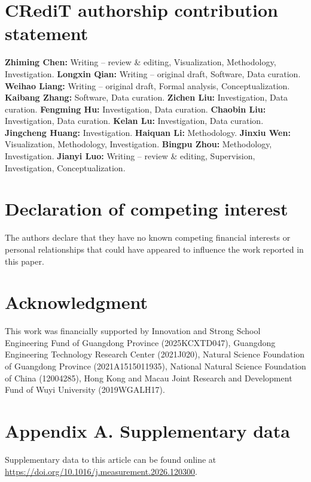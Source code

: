 \documentclass[11pt]{article}
\begin{document}
\section*{CRediT authorship contribution statement}

\textbf{Zhiming Chen:} Writing -- review \& editing,
Visualization, Methodology, Investigation.
\textbf{Longxin Qian:} Writing -- original draft, Software, Data
curation.
\textbf{Weihao Liang:} Writing -- original draft, Formal analysis,
Conceptualization.
\textbf{Kaibang Zhang:} Software, Data curation.
\textbf{Zichen Liu:} Investigation, Data curation.
\textbf{Fengming Hu:} Investigation, Data curation.
\textbf{Chaobin Liu:} Investigation, Data curation.
\textbf{Kelan Lu:} Investigation, Data curation.
\textbf{Jingcheng Huang:} Investigation.
\textbf{Haiquan Li:} Methodology.
\textbf{Jinxiu Wen:} Visualization, Methodology, Investigation.
\textbf{Bingpu Zhou:} Methodology, Investigation.
\textbf{Jianyi Luo:} Writing -- review \& editing, Supervision,
Investigation, Conceptualization.

\section*{Declaration of competing interest}

The authors declare that they have no known competing financial
interests or personal relationships that could have appeared to
influence the work reported in this paper.

\section*{Acknowledgment}

This work was financially supported by Innovation and Strong
School Engineering Fund of Guangdong Province (2025KCXTD047),
Guangdong Engineering Technology Research Center (2021J020),
Natural Science Foundation of Guangdong Province (2021A1515011935),
National Natural Science Foundation of China (12004285), Hong Kong
and Macau Joint Research and Development Fund of Wuyi University
(2019WGALH17).

\section*{Appendix A. Supplementary data}

Supplementary data to this article can be found online at\\
\url{https://doi.org/10.1016/j.measurement.2026.120300}.
\end{document}
